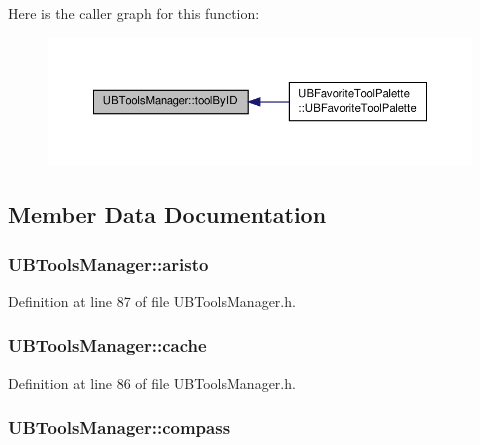 Here is the caller graph for this function\-:
\nopagebreak
\begin{figure}[H]
\begin{center}
\leavevmode
\includegraphics[width=350pt]{df/d8e/class_u_b_tools_manager_a256995fde4af079fbd0dcfac80165133_icgraph}
\end{center}
\end{figure}




\subsection{Member Data Documentation}
\hypertarget{class_u_b_tools_manager_a8032199deee15348df96fe28ac9aa06e}{
\subsubsection[{aristo}]{ U\-B\-Tools\-Manager\-::aristo}}\label{df/d8e/class_u_b_tools_manager_a8032199deee15348df96fe28ac9aa06e}


Definition at line 87 of file U\-B\-Tools\-Manager.\-h.

\hypertarget{class_u_b_tools_manager_aec03d681b2a516439d3fd53835633cb8}{
\subsubsection[{cache}]{ U\-B\-Tools\-Manager\-::cache}}\label{df/d8e/class_u_b_tools_manager_aec03d681b2a516439d3fd53835633cb8}


Definition at line 86 of file U\-B\-Tools\-Manager.\-h.

\hypertarget{class_u_b_tools_manager_a14bfc0697940f6967dfc5c570d27a7f9}{
\subsubsection[{compass}]{ U\-B\-Tools\-Manager\-::compass}}\label{df/d8e/class_u_b_tools_manager_a14bfc0697940f6967dfc5c570d27a7f9}


